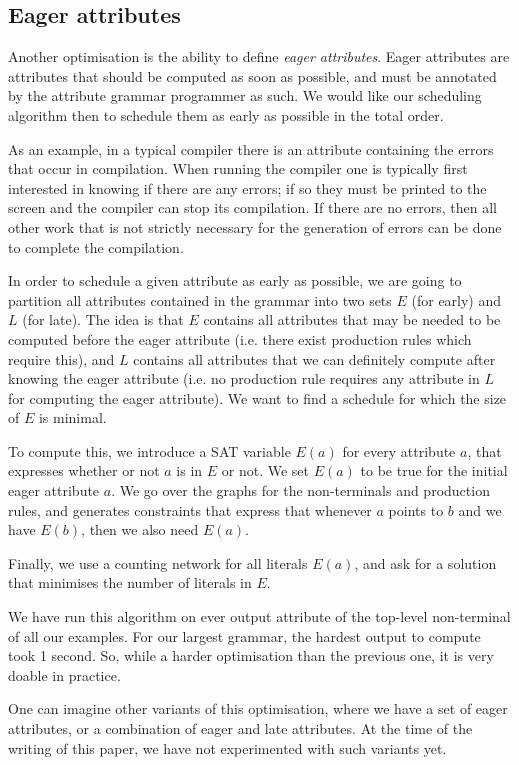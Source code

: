 \documentclass{llncs}
\begin{document}
\subsection{Eager attributes} \label{sect:eagerattributes}
Another optimisation is the ability to define \emph{eager attributes}. Eager attributes are attributes that should be computed as soon as possible, and must be annotated by the attribute grammar programmer as such. We would like our scheduling algorithm then to schedule them as early as possible in the total order.

As an example, in a typical compiler there is an attribute containing the errors that occur in compilation. When running the compiler one is typically first interested in knowing if there are any errors; if so they must be printed to the screen and the compiler can stop its compilation. If there are no errors, then all other work that is not strictly necessary for the generation of errors can be done to complete the compilation.

In order to schedule a given attribute as early as possible, we are going to partition all attributes contained in the grammar into two sets $E$ (for early) and $L$ (for late). The idea is that $E$ contains all attributes that may be needed to be computed before the eager attribute (i.e. there exist production rules which require this), and $L$ contains all attributes that we can definitely compute after knowing the eager attribute (i.e. no production rule requires any attribute in $L$ for computing the eager attribute). We want to find a schedule for which the size of $E$ is minimal.

To compute this, we introduce a SAT variable $E(a)$ for every attribute $a$, that expresses whether or not $a$ is in $E$ or not. We set $E(a)$ to be true for the initial eager attribute $a$. We go over the graphs for the non-terminals and production rules, and generates constraints that express that whenever $a$ points to $b$ and we have $E(b)$, then we also need $E(a)$.

Finally, we use a counting network for all literals $E(a)$, and ask for a solution that minimises the number of literals in $E$.

We have run this algorithm on ever output attribute of the top-level non-terminal of all our examples. For our largest grammar, the hardest output to compute took 1 second. So, while a harder optimisation than the previous one, it is very doable in practice.

One can imagine other variants of this optimisation, where we have a set of eager attributes, or a combination of eager and late attributes. At the time of the writing of this paper, we have not experimented with such variants yet.
\end{document}
